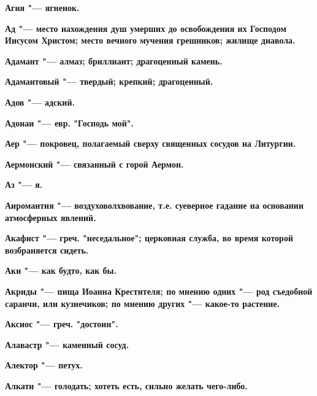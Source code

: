 \bfseries Агня \normalfont{} "--- ягненок. 




\bfseries Ад \normalfont{} "--- место нахождения душ умерших до освобождения их Господом Иисусом Христом; место вечного мучения грешников; жилище диавола. 




\bfseries Адамант \normalfont{} "--- алмаз; бриллиант; драгоценный камень. 




\bfseries Адамантовый \normalfont{} "--- твердый; крепкий; драгоценный. 




\bfseries Адов \normalfont{} "--- адский. 




\bfseries Адонаи \normalfont{} "--- евр. "Господь мой". 




\bfseries Аер \normalfont{} "--- покровец, полагаемый сверху священных сосудов на Литургии. 




\bfseries Аермонский \normalfont{} "--- связанный с горой Аермон. 




\bfseries Аз \normalfont{} "--- я. 




\bfseries Аиромантия \normalfont{} "--- воздуховолхвование, т.е. суеверное гадание на основании атмосферных явлений. 




\bfseries Акафист \normalfont{} "--- греч. "неседальное"; церковная служба, во время которой возбраняется сидеть. 




\bfseries Аки \normalfont{} "--- как будто, как бы. 




\bfseries Акриды \normalfont{} "--- пища Иоанна Крестителя; по мнению одних "--- род съедобной саранчи, или кузнечиков; по мнению других "--- какое-то растение. 




\bfseries Аксиос \normalfont{} "--- греч. "достоин". 




\bfseries Алавастр \normalfont{} "--- каменный сосуд. 




\bfseries Алектор \normalfont{} "--- петух. 




\bfseries Алкати \normalfont{} "--- голодать; хотеть есть, сильно желать чего-либо. 




